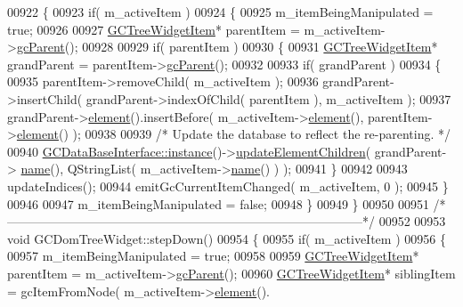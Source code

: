 \begin{DoxyCode}
00922 \{
00923   \textcolor{keywordflow}{if}( m\_activeItem )
00924   \{
00925     m\_itemBeingManipulated = \textcolor{keyword}{true};
00926 
00927     \hyperlink{class_g_c_tree_widget_item}{GCTreeWidgetItem}* parentItem = m\_activeItem->\hyperlink{class_g_c_tree_widget_item_a1125dbc55a8ba3e50662b8258cb35fdf}{gcParent}();
00928 
00929     \textcolor{keywordflow}{if}( parentItem )
00930     \{
00931       \hyperlink{class_g_c_tree_widget_item}{GCTreeWidgetItem}* grandParent = parentItem->\hyperlink{class_g_c_tree_widget_item_a1125dbc55a8ba3e50662b8258cb35fdf}{gcParent}();
00932 
00933       \textcolor{keywordflow}{if}( grandParent )
00934       \{
00935         parentItem->removeChild( m\_activeItem );
00936         grandParent->insertChild( grandParent->indexOfChild( parentItem ), 
      m\_activeItem );
00937         grandParent->\hyperlink{class_g_c_tree_widget_item_a584cad866bdbd94710d31eb77b804d84}{element}().insertBefore( m\_activeItem->\hyperlink{class_g_c_tree_widget_item_a584cad866bdbd94710d31eb77b804d84}{element}(), 
      parentItem->\hyperlink{class_g_c_tree_widget_item_a584cad866bdbd94710d31eb77b804d84}{element}() );
00938 
00939         \textcolor{comment}{/* Update the database to reflect the re-parenting. */}
00940         \hyperlink{class_g_c_data_base_interface_a1baea9c0667aa8b610ec30076fcab84c}{GCDataBaseInterface::instance}()->\hyperlink{class_g_c_data_base_interface_a91a60134bfb21a3f49d826340bebb852}{updateElementChildren}( grandParent->
      \hyperlink{class_g_c_tree_widget_item_a3af8c66a690cd55986a38b996a375ba4}{name}(), QStringList( m\_activeItem->\hyperlink{class_g_c_tree_widget_item_a3af8c66a690cd55986a38b996a375ba4}{name}() ) );
00941       \}
00942 
00943       updateIndices();
00944       emitGcCurrentItemChanged( m\_activeItem, 0 );
00945     \}
00946 
00947     m\_itemBeingManipulated = \textcolor{keyword}{false};
00948   \}
00949 \}
00950 
00951 \textcolor{comment}{/*
      --------------------------------------------------------------------------------------*/}
00952 
00953 \textcolor{keywordtype}{void} GCDomTreeWidget::stepDown()
00954 \{
00955   \textcolor{keywordflow}{if}( m\_activeItem )
00956   \{
00957     m\_itemBeingManipulated = \textcolor{keyword}{true};
00958 
00959     \hyperlink{class_g_c_tree_widget_item}{GCTreeWidgetItem}* parentItem = m\_activeItem->\hyperlink{class_g_c_tree_widget_item_a1125dbc55a8ba3e50662b8258cb35fdf}{gcParent}();
00960     \hyperlink{class_g_c_tree_widget_item}{GCTreeWidgetItem}* siblingItem = gcItemFromNode( m\_activeItem->\hyperlink{class_g_c_tree_widget_item_a584cad866bdbd94710d31eb77b804d84}{element}().

\end{DoxyCode}
